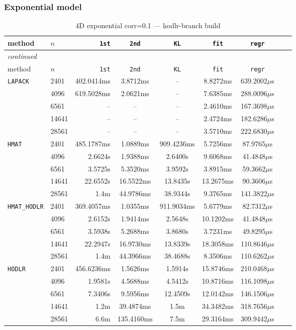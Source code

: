 \documentclass[11pt,a4paper]{article}
\begin{document}
\subsubsection*{Exponential model}
\begin{center}
\begin{longtable}{llrcccccc}
\caption{4D exponential corr=0.1 --- hodlr-branch build}
\\\toprule
method & $n$ & \texttt{1st} & \texttt{2nd} & \texttt{KL} & \texttt{fit} & \texttt{regr}\\
\midrule
\endfirsthead
\multicolumn{8}{l}{\small\emph{continued}}\\
\toprule
method & $n$ & \texttt{1st} & \texttt{2nd} & \texttt{KL} & \texttt{fit} & \texttt{regr}\\
\midrule
\endhead

\texttt{LAPACK} & 2401 & 402.0414ms & 3.8712ms & -- & 8.8272ms & 639.2002$\mu$s\\
 & 4096 & 619.5028ms & 2.0621ms & -- & 7.6385ms & 288.0096$\mu$s\\
 & 6561 & -- & -- & -- & 2.4610ms & 167.3698$\mu$s\\
 & 14641 & -- & -- & -- & 2.4724ms & 182.6286$\mu$s\\
 & 28561 & -- & -- & -- & 3.5710ms & 222.6830$\mu$s\\
\texttt{HMAT} & 2401 & 485.1787ms & 1.0889ms & 909.4236ms & 5.7256ms & 87.9765$\mu$s\\
 & 4096 & 2.6624s & 1.9388ms & 2.6400s & 9.6068ms & 41.4848$\mu$s\\
 & 6561 & 3.5725s & 5.3520ms & 3.9592s & 3.8915ms & 59.3662$\mu$s\\
 & 14641 & 22.6552s & 16.5522ms & 13.8435s & 13.2675ms & 90.3606$\mu$s\\
 & 28561 & 1.4m & 44.9786ms & 38.9344s & 9.3765ms & 141.3822$\mu$s\\
\texttt{HMAT\_HODLR} & 2401 & 369.4057ms & 1.0355ms & 911.9034ms & 5.6779ms & 82.7312$\mu$s\\
 & 4096 & 2.6152s & 1.9414ms & 2.5648s & 10.1202ms & 41.4848$\mu$s\\
 & 6561 & 3.5938s & 5.2688ms & 3.8680s & 3.7231ms & 49.8295$\mu$s\\
 & 14641 & 22.2947s & 16.9730ms & 13.8339s & 18.3058ms & 110.8646$\mu$s\\
 & 28561 & 1.4m & 44.3966ms & 38.4688s & 8.3506ms & 110.6262$\mu$s\\
\texttt{HODLR} & 2401 & 456.6236ms & 1.5626ms & 1.5914s & 15.8746ms & 210.0468$\mu$s\\
 & 4096 & 1.9581s & 4.5688ms & 4.5412s & 10.8716ms & 116.1098$\mu$s\\
 & 6561 & 7.3406s & 9.5956ms & 12.4509s & 12.0142ms & 146.1506$\mu$s\\
 & 14641 & 1.2m & 39.4874ms & 1.5m & 34.3482ms & 318.7656$\mu$s\\
 & 28561 & 6.6m & 135.4160ms & 7.5m & 29.3164ms & 309.9442$\mu$s\\
\bottomrule\end{longtable}\end{center}
\end{document}
